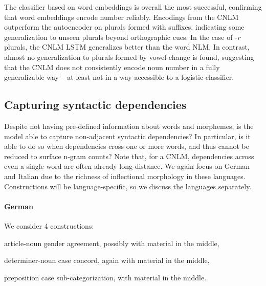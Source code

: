 The classifier based on word embeddings is overall the most successful, confirming that word embeddings encode number reliably.
Encodings from the CNLM outperform the autoencoder on plurals formed with suffixes, indicating some generalization to unseen plurals beyond orthographic cues.
In the case of -\emph{r} plurals, the CNLM LSTM generalizes better than the word NLM.
In contrast, almost no generalization to plurals formed by vowel change is found, suggesting that the CNLM does not consistently encode noun number in a fully generalizable way -- at least not in a way accessible to a logistic classifier.


\subsection{Capturing syntactic dependencies}
\label{sec:dependencies}

Despite not having pre-defined information about words and morphemes, is the model able to capture non-adjacent syntactic dependencies?
In particular, is it able to do so when dependencies cross one or more words, and thus cannot be reduced to surface n-gram counts?
Note that, for a CNLM, dependencies across even a single word are often already long-distance. %
We again focus on German and Italian due to the richness of inflectional morphology in these languages.
Constructions will be language-specific, so we discuss the languages separately. %


\paragraph{German} We consider 4 constructions:
\begin{inparaenum}[i)]
\item article-noun gender agreement, possibly with material in the middle,
\item determiner-noun case concord, again with material in the middle,
\item preposition case sub-categorization, with material in the middle.
\end{inparaenum}


